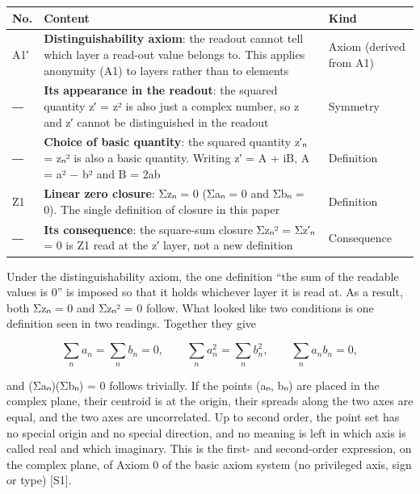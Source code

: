 \documentclass[
  a4paper,
]{article}
\newcounter{none} %
\begin{document}
{\def\LTcaptype{none} %
\begin{longtable}[]{@{}
  >{\raggedright\arraybackslash}p{}
  >{\raggedright\arraybackslash}p{}
  >{\raggedright\arraybackslash}p{}@{}}
\toprule\noalign{}
\begin{minipage}[b]{\linewidth}\raggedright
No.
\end{minipage} & \begin{minipage}[b]{\linewidth}\raggedright
Content
\end{minipage} & \begin{minipage}[b]{\linewidth}\raggedright
Kind
\end{minipage} \\
\midrule\noalign{}
\endhead
\bottomrule\noalign{}
\endlastfoot
A1′ & \textbf{Distinguishability axiom}: the readout cannot tell which
layer a read-out value belongs to. This applies anonymity (A1) to layers
rather than to elements & Axiom (derived from A1) \\
― & \textbf{Its appearance in the readout}: the squared quantity z′ = z²
is also just a complex number, so z and z′ cannot be distinguished in
the readout & Symmetry \\
― & \textbf{Choice of basic quantity}: the squared quantity z′ₙ = zₙ² is
also a basic quantity. Writing z′ = A + iB, A = a² − b² and B = 2ab &
Definition \\
Z1 & \textbf{Linear zero closure}: Σzₙ = 0 (Σaₙ = 0 and Σbₙ = 0). The
single definition of closure in this paper & Definition \\
― & \textbf{Its consequence}: the square-sum closure Σzₙ² = Σz′ₙ = 0 is
Z1 read at the z′ layer, not a new definition & Consequence \\
\end{longtable}
}

Under the distinguishability axiom, the one definition ``the sum of the
readable values is 0'' is imposed so that it holds whichever layer it is
read at. As a result, both Σzₙ = 0 and Σzₙ² = 0 follow. What looked like
two conditions is one definition seen in two readings. Together they
give

\[
\sum_n a_n=\sum_n b_n=0,\qquad \sum_n a_n^2=\sum_n b_n^2,\qquad \sum_n a_nb_n=0 ,
\]

and (Σaₙ)(Σbₙ) = 0 follows trivially. If the points (aₙ, bₙ) are placed
in the complex plane, their centroid is at the origin, their spreads
along the two axes are equal, and the two axes are uncorrelated. Up to
second order, the point set has no special origin and no special
direction, and no meaning is left in which axis is called real and which
imaginary. This is the first- and second-order expression, on the
complex plane, of Axiom 0 of the basic axiom system (no privileged axis,
sign or type) {[}S1{]}.
\end{document}
